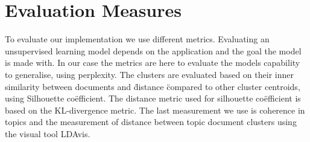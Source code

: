 \begin{comment}

\section{Syslog}\label{methodology:syslog}
Syslogs are textual messages \cite{Stearley2004TowardsSyslogs} which contain the messages provided by the systems.


\section{Challenges}

\subsection{Natural Language Processing}


\subsection{Semantics}


\subsection{Sentiment analysis}


\subsection{Extract, Transform, Load}

\end{comment}


\section{Evaluation Measures}\label{methodology:evaluation measures}
To evaluate our implementation we use different metrics. Evaluating an unsupervised learning model depends on the application and the goal the model is made with. In our case the metrics are here to evaluate the models capability to generalise, using perplexity. The clusters are evaluated based on their inner similarity between documents and \" distance \" compared to other cluster centroids, using Silhouette co\"efficient. The distance metric used for silhouette co\"efficient is based on the KL-divergence metric. The last measurement we use is coherence in topics and the measurement of distance between topic document clusters using the visual tool LDAvis.

